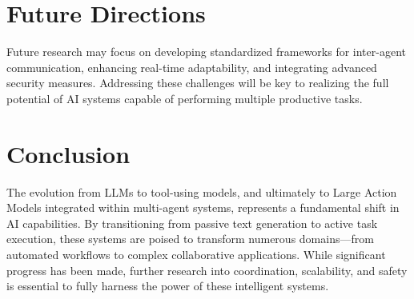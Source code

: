 \documentclass[journal,twoside,10pt]{IEEEtran}
\begin{document}
\section{Future Directions}
Future research may focus on developing standardized frameworks for inter-agent communication, enhancing real-time adaptability, and integrating advanced security measures. Addressing these challenges will be key to realizing the full potential of AI systems capable of performing multiple productive tasks.

\section{Conclusion}
The evolution from LLMs to tool-using models, and ultimately to Large Action Models integrated within multi-agent systems, represents a fundamental shift in AI capabilities. By transitioning from passive text generation to active task execution, these systems are poised to transform numerous domains—from automated workflows to complex collaborative applications. While significant progress has been made, further research into coordination, scalability, and safety is essential to fully harness the power of these intelligent systems.



\end{document}
